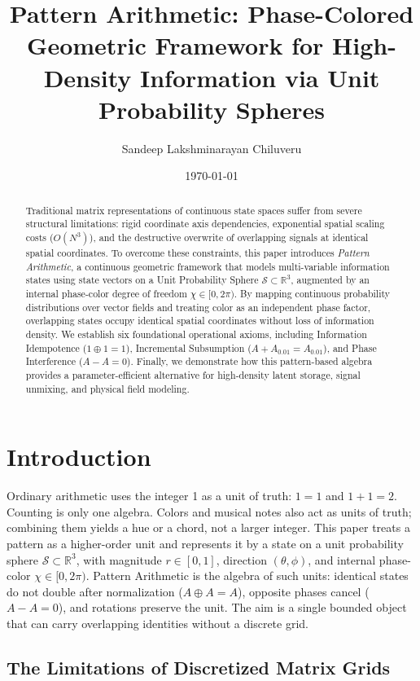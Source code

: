 \documentclass[12pt, a4paper]{article}
\title{Pattern Arithmetic: Phase-Colored Geometric Framework for High-Density Information via Unit Probability Spheres}
\author{Sandeep Lakshminarayan Chiluveru}
\date{\today}
\begin{document}
\maketitle

\begin{abstract}
Traditional matrix representations of continuous state spaces suffer from severe structural limitations: rigid coordinate axis dependencies, exponential spatial scaling costs ($O(N^3)$), and the destructive overwrite of overlapping signals at identical spatial coordinates. To overcome these constraints, this paper introduces \textit{Pattern Arithmetic}, a continuous geometric framework that models multi-variable information states using state vectors on a Unit Probability Sphere $\mathcal{S} \subset \mathbb{R}^3$, augmented by an internal phase-color degree of freedom $\chi \in [0, 2\pi)$. By mapping continuous probability distributions over vector fields and treating color as an independent phase factor, overlapping states occupy identical spatial coordinates without loss of information density. We establish six foundational operational axioms, including Information Idempotence ($1 \oplus 1 = 1$), Incremental Subsumption ($A + A_{0.01} = A_{0.01}$), and Phase Interference ($A - A = 0$). Finally, we demonstrate how this pattern-based algebra provides a parameter-efficient alternative for high-density latent storage, signal unmixing, and physical field modeling.
\end{abstract}

\section{Introduction}

Ordinary arithmetic uses the integer 1 as a unit of truth: $1=1$ and $1+1=2$. Counting is only one algebra. Colors and musical notes also act as units of truth; combining them yields a hue or a chord, not a larger integer. This paper treats a pattern as a higher-order unit and represents it by a state on a unit probability sphere $\mathcal{S} \subset \mathbb{R}^3$, with magnitude $r \in [0,1]$, direction $(\theta, \phi)$, and internal phase-color $\chi \in [0, 2\pi)$. Pattern Arithmetic is the algebra of such units: identical states do not double after normalization ($A \oplus A = A$), opposite phases cancel ($A - A = 0$), and rotations preserve the unit. The aim is a single bounded object that can carry overlapping identities without a discrete grid.

\subsection{The Limitations of Discretized Matrix Grids}
\end{document}
